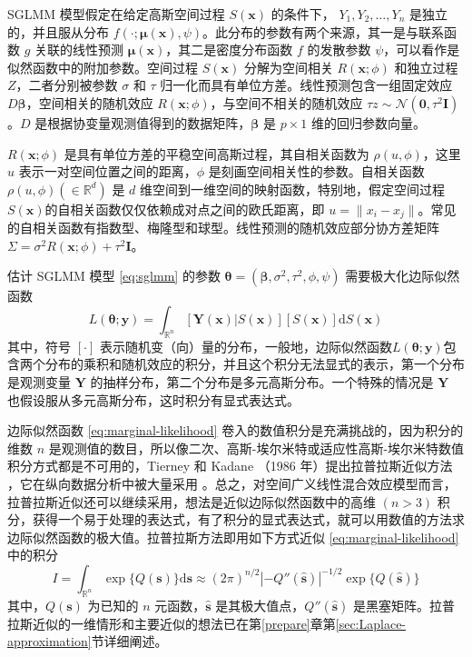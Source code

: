 \documentclass[12pt,a4paper,UTF8,twoside]{book}
\theoremstyle{definition}
\theoremstyle{definition}
\theoremstyle{definition}
\theoremstyle{remark}
\begin{document}
\noindent SGLMM 模型假定在给定高斯空间过程 \(S(\mathbf{x})\) 的条件下，
\(Y_1,Y_2,\ldots,Y_n\) 是独立的，并且服从分布
\(f(\cdot;\boldsymbol{\mu(x)},\psi)\)。此分布的参数有两个来源，其一是与联系函数
\(g\) 关联的线性预测 \(\boldsymbol{\mu(x)}\)，其二是密度分布函数 \(f\)
的发散参数 \(\psi\)，可以看作是似然函数中的附加参数。空间过程
\(S(\mathbf{x})\) 分解为空间相关 \(R(\mathbf{x};\phi)\) 和独立过程
\(Z\)，二者分别被参数 \(\sigma\) 和 \(\tau\)
归一化而具有单位方差。线性预测包含一组固定效应
\(D\boldsymbol{\beta}\)，空间相关的随机效应
\(R(\mathbf{x};\phi)\)，与空间不相关的随机效应
\(\tau z \sim \mathcal{N}(\mathbf{0},\tau^2\mathbf{I})\)。\(D\)
是根据协变量观测值得到的数据矩阵，\(\boldsymbol{\beta}\) 是
\(p \times 1\) 维的回归参数向量。

\(R(\mathbf{x};\phi)\) 是具有单位方差的平稳空间高斯过程，其自相关函数为
\(\rho(u,\phi)\)，这里 \(u\) 表示一对空间位置之间的距离，\(\phi\)
是刻画空间相关性的参数。自相关函数 \(\rho(u,\phi) (\in \mathbb{R}^d)\)
是 \(d\) 维空间到一维空间的映射函数，特别地，假定空间过程
\(S(\mathbf{x})\)的自相关函数仅仅依赖成对点之间的欧氏距离，即
\(u =\|x_i - x_j\|\)。常见的自相关函数有指数型、梅隆型和球型。线性预测的随机效应部分协方差矩阵
\(\Sigma = \sigma^2 R(\mathbf{x};\phi) + \tau^2\mathbf{I}\)。

估计 SGLMM 模型 \eqref{eq:sglmm} 的参数
\(\boldsymbol{\theta} = (\boldsymbol{\beta},\sigma^2,\tau^2,\phi,\psi)\)
需要极大化边际似然函数 \begin{equation}
L(\boldsymbol{\theta};\mathbf{y}) = \int_{\mathbb{R}^n} [\mathbf{Y(x)}|S(\mathbf{x})][S(\mathbf{x})]\mathrm{d}S(\mathbf{x}) \label{eq:marginal-likelihood}
\end{equation} \noindent 其中，符号 \([\cdot]\)
表示随机变（向）量的分布，一般地，边际似然函数\(L(\boldsymbol{\theta};\mathbf{y})\)包含两个分布的乘积和随机效应的积分，并且这个积分无法显式的表示，第一个分布是观测变量
\(\mathbf{Y}\) 的抽样分布，第二个分布是多元高斯分布。一个特殊的情况是
\(\mathbf{Y}\) 也假设服从多元高斯分布，这时积分有显式表达式。

边际似然函数 \eqref{eq:marginal-likelihood}
卷入的数值积分是充满挑战的，因为积分的维数 \(n\)
是观测值的数目，所以像二次、高斯-埃尔米特或适应性高斯-埃尔米特数值积分方式都是不可用的，Tierney
和 Kadane （1986 年）提出拉普拉斯近似方法
\citep{Tierney1986}，它在纵向数据分析中被大量采用
\citep{Diggle2002Analysis}。总之，对空间广义线性混合效应模型而言，拉普拉斯近似还可以继续采用，想法是近似边际似然函数中的高维
\((n > 3)\)
积分，获得一个易于处理的表达式，有了积分的显式表达式，就可以用数值的方法求边际似然函数的极大值。拉普拉斯方法即用如下方式近似
\eqref{eq:marginal-likelihood} 中的积分 \begin{equation}
I   =  \int_{\mathbb{R}^n} \exp\{Q(\mathbf{s})\}\mathrm{d}\mathbf{s} 
  \approx  (2\pi)^{n/2} |-Q''(\hat{\mathbf{s}})|^{-1/2}\exp\{Q(\hat{\mathbf{s}})\} \label{eq:laplace-approximate}
\end{equation} \noindent 其中，\(Q(\mathbf{s})\) 为已知的 \(n\)
元函数，\(\hat{\mathbf{s}}\) 是其极大值点，\(Q''(\hat{\mathbf{s}})\)
是黑塞矩阵。拉普拉斯近似的一维情形和主要近似的想法已在第\ref{prepare}章第\ref{sec:Laplace-approximation}节详细阐述。
\end{document}
